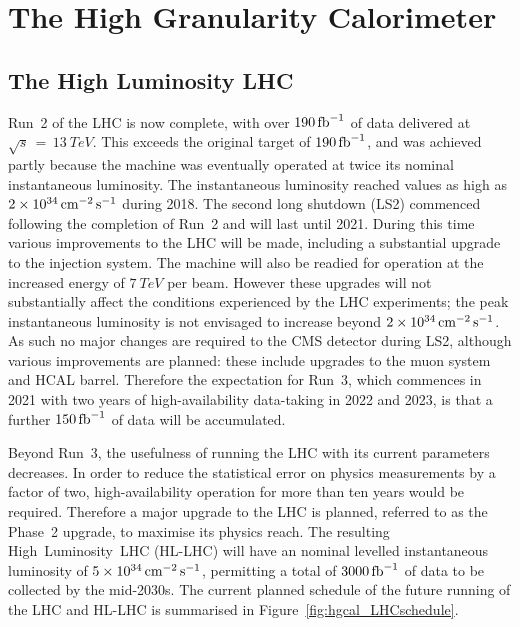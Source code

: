 \chapter{The High Granularity Calorimeter}
\label{chap:hgcal}

\section{The High Luminosity LHC}

Run~2 of the LHC is now complete, with over $\SI{190}{\ensuremath{\textrm{fb}^{-1}}}$ of data delivered at $\sqrt{s}\,=\,\SI{13}{TeV}$. %
This exceeds the original target of $\SI{190}{\ensuremath{\textrm{fb}^{-1}}}$, and was achieved partly because the machine was eventually operated at twice its nominal instantaneous luminosity.
The instantaneous luminosity reached values as high as $\SI{2e34}{\ensuremath{\textrm{cm}^{-2}\,\textrm{s}^{-1}}}$ during 2018.
The second long shutdown (LS2) commenced following the completion of Run~2 and will last until 2021.
During this time various improvements to the LHC will be made, including a substantial upgrade to the injection system.
The machine will also be readied for operation at the increased energy of $\SI{7}{TeV}$ per beam.
However these upgrades will not substantially affect the conditions experienced by the LHC experiments; 
the peak instantaneous luminosity is not envisaged to increase beyond $\SI{2e34}{\ensuremath{\textrm{cm}^{-2}\,\textrm{s}^{-1}}}$.
As such no major changes are required to the CMS detector during LS2, although various improvements are planned: 
these include upgrades to the muon system and HCAL barrel.
Therefore the expectation for Run~3, which commences in 2021 with two years of high-availability data-taking in 2022 and 2023, 
is that a further $\SI{150}{\ensuremath{\textrm{fb}^{-1}}}$ of data will be accumulated. 

Beyond Run~3, the usefulness of running the LHC with its current parameters decreases.
In order to reduce the statistical error on physics measurements by a factor of two, high-availability operation for more than ten years would be required.
Therefore a major upgrade to the LHC is planned, referred to as the Phase~2 upgrade, to maximise its physics reach. 
The resulting High~Luminosity~LHC (HL-LHC) \cite{HLLHC} will have an nominal levelled instantaneous luminosity of $\SI{5e34}{\ensuremath{\textrm{cm}^{-2}\,\textrm{s}^{-1}}}$, 
permitting a total of $\SI{3000}{\ensuremath{\textrm{fb}^{-1}}}$ of data to be collected by the mid-2030s.
The current planned schedule of the future running of the LHC and HL-LHC is summarised in Figure~\ref{fig:hgcal_LHCschedule}.

